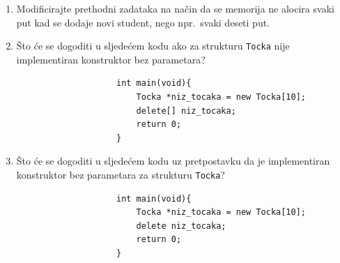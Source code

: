 \begin{razmisljanje}
    \begin{enumerate}
        \item Modificirajte prethodni zadataka na način da se memorija ne alocira svaki put kad se dodaje novi student, nego npr.\ svaki deseti put.
        \item Što će se dogoditi u sljedećem kodu ako za strukturu \texttt{Tocka} nije implementiran konstruktor bez parametara?
                \begin{verbatim}
                    int main(void){
                        Tocka *niz_tocaka = new Tocka[10];
                        delete[] niz_tocaka;
                        return 0;
                    }
    \end{verbatim}

        \item Što će se dogoditi u sljedećem kodu uz pretpostavku da je implementiran konstruktor bez parametara za strukturu \texttt{Tocka}?
                \begin{verbatim}
                    int main(void){
                        Tocka *niz_tocaka = new Tocka[10];
                        delete niz_tocaka;
                        return 0;
                    }
    \end{verbatim}
    \end{enumerate}
\end{razmisljanje}